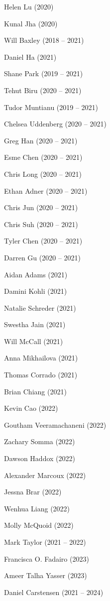 \documentclass{tufte-book} %
\begin{document}
\begin{fullwidth}
\begin{multicols}{2}
\begin{list}{\quad}{}
\item Helen Lu (2020)
\item Kunal Jha (2020)
\item Will Baxley (2018 -- 2021)
\item Daniel Ha (2021)
\item Shane Park (2019 -- 2021)
\item Tehut Biru (2020 -- 2021)
\item Tudor Muntianu (2019 -- 2021)
\item Chelsea Uddenberg (2020 -- 2021)
\item Greg Han (2020 -- 2021)
\item Esme Chen (2020 -- 2021)
\item Chris Long (2020 -- 2021)
\item Ethan Adner (2020 -- 2021)
\item Chris Jun (2020 -- 2021)
\item Chris Suh (2020 -- 2021)
\item Tyler Chen (2020 -- 2021)
\item Darren Gu (2020 -- 2021)
\item Aidan Adams (2021)
\item Damini Kohli (2021)
\item Natalie Schreder (2021)
\item Swestha Jain (2021)
\item Will McCall (2021)
\item Anna Mikhailova (2021)
\item Thomas Corrado (2021)
\item Brian Chiang (2021)
\item Kevin Cao (2022)
\item Goutham Veeramachaneni (2022)
\item Zachary Somma (2022)
\item Dawson Haddox (2022)
\item Alexander Marcoux (2022)
\item Jessna Brar (2022)
\item Wenhua Liang (2022)
\item Molly McQuoid (2022)
\item Mark Taylor (2021 -- 2022)
\item Francisca O. Fadairo (2023)
\item Ameer Talha Yasser (2023)
\item Daniel Carstensen (2021 -- 2024)

\end{list}
\end{multicols}
\end{fullwidth}
\end{document}
